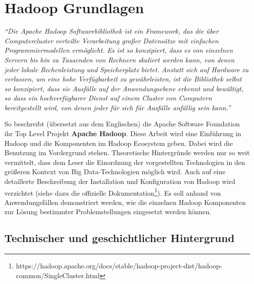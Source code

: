 \chapter{Hadoop Grundlagen}
\textit{``Die Apache Hadoop Softwarebibliothek ist ein Framework, das die über Computercluster verteilte Verarbeitung großer Datensätze mit einfachen Programmiermodellen ermöglicht. Es ist so konzipiert, dass es von einzelnen Servern bis hin zu Tausenden von Rechnern skaliert werden kann, von denen jeder lokale Rechenleistung und Speicherplatz bietet. Anstatt sich auf Hardware zu verlassen, um eine hohe Verfügbarkeit zu gewährleisten, ist die Bibliothek selbst so konzipiert, dass sie Ausfälle auf der Anwendungsebene erkennt und bewältigt, so dass ein hochverfügbarer Dienst auf einem Cluster von Computern bereitgestellt wird, von denen jeder für sich für Ausfälle anfällig sein kann.''}\cite{noauthor_apache_nodate}
\par
So beschreibt (übersetzt aus dem Englischen) die Apache Software Foundation ihr Top Level Projekt \textbf{Apache Hadoop}. Diese Arbeit wird eine Einführung in Hadoop und die Komponenten im Hadoop Ecosystem geben. Dabei wird die Benutzung im Vordergrund stehen. Theoretische Hintergründe werden nur so weit vermittelt, dass dem Leser die Einordnung der vorgestellten Technologien in den größeren Kontext von Big Data-Technologien möglich wird. Auch auf eine detaillerte Beschreibung der Installation und Konfiguration von Hadoop wird verzichtet (siehe dazu die offizielle Dokumentation\footnote{https://hadoop.apache.org/docs/stable/hadoop-project-dist/hadoop-common/SingleCluster.html}). Es soll anhand von Anwendungsfällen demonstriert werden, wie die einzelnen Hadoop Komponenten zur Lösung bestimmter Problemstellungen eingesetzt werden können. 

\section{Technischer und geschichtlicher Hintergrund}
